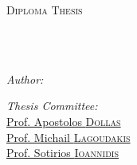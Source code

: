 \documentclass[
	12pt, %
	english, %
	onehalfspacing,
	liststotoc, %
	toctotoc, %
	parskip, %
	headsepline, %
]{MastersDoctoralThesis} %
\author{Tzanis \textsc{Fotakis}} %
\begin{document}
\frontmatter %

\pagestyle{plain} %


\begin{titlepage}
	\begin{center}

		\vspace*{.06\textheight}
		{\scshape\LARGE \univname\par}\vspace{1.5cm} %
		\textsc{\Large Diploma Thesis}\\[0.5cm] %

		\HRule \\[0.4cm] %
		{\huge \bfseries \ttitle\par}\vspace{0.4cm} %
		\HRule \\[1.5cm] %

		\begin{minipage}[t]{0.4\textwidth}
			\begin{flushleft} \large
				\emph{Author:}\\
				\href{https://www.linkedin.com/in/fotakistzanis/}{\authorname} %
			\end{flushleft}
		\end{minipage}
		\begin{minipage}[t]{0.5\textwidth}
			\begin{flushright} \large
				\emph{Thesis Committee:} \\
				\href{https://www.ece.tuc.gr/index.php?id=4531&tx_tuclabspersonnel_list%5Bperson%5D=289&tx_tuclabspersonnel_list%5Baction%5D=person&tx_tuclabspersonnel_list%5Bcontroller%5D=List}{Prof. Apostolos \textsc{Dollas}}\\ %
				\href{https://www.ece.tuc.gr/index.php?id=4531&tx_tuclabspersonnel_list%5Bperson%5D=313&tx_tuclabspersonnel_list%5Baction%5D=person&tx_tuclabspersonnel_list%5Bcontroller%5D=List}{Prof. Michail \textsc{Lagoudakis}}\\
				\href{https://www.tuc.gr/index.php?id=5639&L=612%27A%3D0&tx_tuclabspersonnel_pi3%5Bpersonid%5D=707}{Prof. Sotirios \textsc{Ioannidis}}
			\end{flushright}
		\end{minipage}\\[0.2cm]


\end{center}
\end{titlepage}
\end{document}
